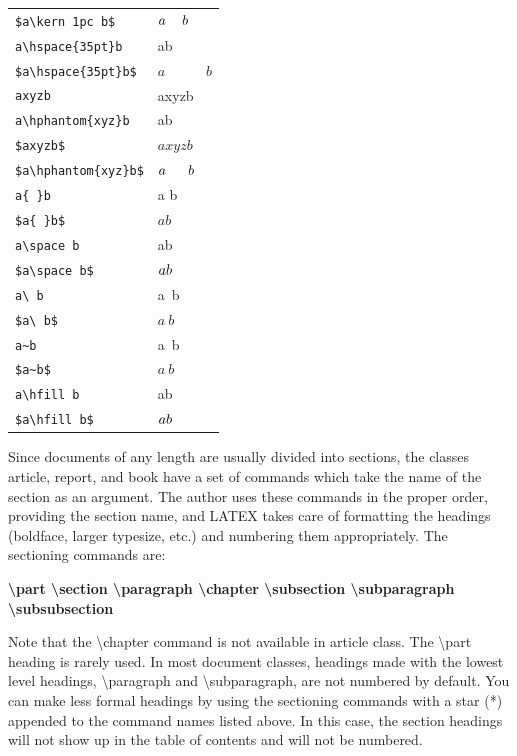 \documentclass[a4paper,11pt,UTF8,openright]{book}
\begin{document}
\begin{center}
\begin{longtable}{p{}p{}}
	\verb|$a\kern 1pc b$|          & $a\kern 1pc b$ \\
	\verb|a\hspace{35pt}b|         & a\hspace{35pt}b \\
	\verb|$a\hspace{35pt}b$|       & $a\hspace{35pt}b$ \\
	\verb|axyzb|                   & axyzb \\
	\verb|a\hphantom{xyz}b|        & a\hphantom{xyz}b \\
	\verb|$axyzb$|                 & $axyzb$ \\
	\verb|$a\hphantom{xyz}b$|      & $a\hphantom{xyz}b$ \\
	\verb|a{ }b|                   & a{ }b \\
	\verb|$a{ }b$|                 & $a{ }b$ \\
	\verb|a\space b|               & a\space b \\
	\verb|$a\space b$|             & $a\space b$ \\
	\verb|a\ b|                    & a\ b \\
	\verb|$a\ b$|                  & $a\ b$ \\
	\verb|a~b|                     & a~b \\
	\verb|$a~b$|                   & $a~b$ \\
	\verb|a\hfill b|               & a\hfill b \\
	\verb|$a\hfill b$|             & $a\hfill b$ \\
\end{longtable}
\end{center}

Since documents of any length are usually divided into sections, the classes article,
report, and book have a set of commands which take the name of the section as an
argument. The author uses these commands in the proper order, providing the section
name, and LATEX takes care of formatting the headings (boldface, larger typesize, etc.)
and numbering them appropriately. The sectioning commands are:

\textbf{\textbackslash part \textbackslash section \textbackslash paragraph
\textbackslash chapter \textbackslash subsection \textbackslash subparagraph
\textbackslash subsubsection}

Note that the \textbackslash chapter command is not available in article class. The \textbackslash part heading is rarely used. In most document classes, headings made with
the lowest level headings, \textbackslash paragraph and \textbackslash subparagraph, are not numbered by default.
You can make less formal headings by using the sectioning commands with a star (*) appended to the command names listed above. In this case, the section headings will
not show up in the table of contents and will not be numbered.
\end{document}
